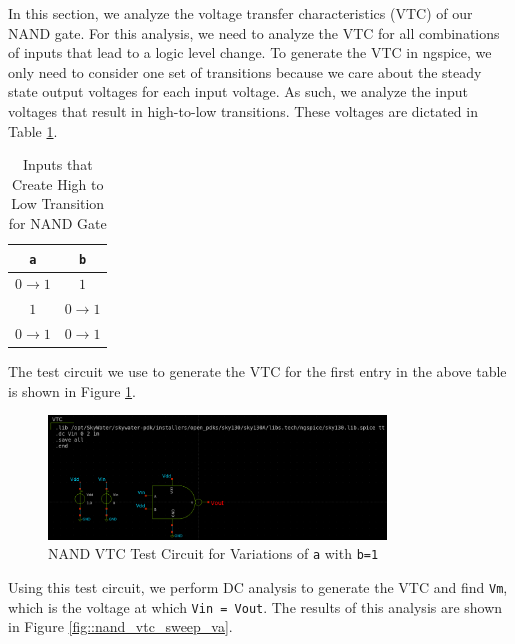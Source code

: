 \documentclass[fleqn]{article}
\begin{document}
	In this section, we analyze the voltage transfer characteristics (VTC) of our NAND gate. For this analysis, we need to analyze the VTC for all combinations of inputs that lead to a logic level change. To generate the VTC in ngspice, we only need to consider one set of transitions because we care about the steady state output voltages for each input voltage. As such, we analyze the input voltages that result in high-to-low transitions. These voltages are dictated in Table \ref{table::nand_gate_high_to_low_transitions}.
	
	\begin{table}[H]
	\begin{center}
	\caption{Inputs that Create High to Low Transition for NAND Gate}
	\label{table::nand_gate_high_to_low_transitions}
	\begin{tabular}{| c | c |}
		\hline
		\texttt{a} & \texttt{b} \\
		\hline	
		$0 \rightarrow 1$ & $1$\\
		\hline	
		$1$ & $0 \rightarrow 1$\\
		\hline	
		$0 \rightarrow 1$ & $0 \rightarrow 1$\\
		\hline
	\end{tabular}
	\end{center}
	\end{table}
	
	\noindent The test circuit we use to generate the VTC for the first entry in the above table is shown in Figure \ref{fig::nand_vtc_test_sweep_va}.
	
	\begin{figure}[H]
		\centerline{\includegraphics[width=0.8\textwidth]{nand_vtc_test_sweep_va.png}}
		\caption{NAND VTC Test Circuit for Variations of \texttt{a} with \texttt{b=1}}
		\label{fig::nand_vtc_test_sweep_va}
	\end{figure}	
	
	\noindent Using this test circuit, we perform DC analysis to generate the VTC and find \texttt{Vm}, which is the voltage at which \texttt{Vin = Vout}. The results of this analysis are shown in Figure \ref{fig::nand_vtc_sweep_va}.
	
\end{document}
